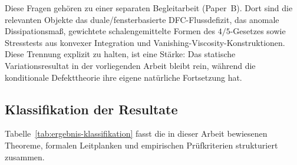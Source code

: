 \documentclass[12pt,a4paper]{article}
\theoremstyle{definition}
\theoremstyle{plain}
\theoremstyle{remark}
\begin{document}
Diese Fragen gehören zu einer separaten Begleitarbeit (Paper~B). Dort sind die relevanten Objekte
das duale/fensterbasierte DFC-Flussdefizit, das anomale Dissipationsmaß,
gewichtete schalengemittelte Formen des $4/5$-Gesetzes sowie Stresstests aus konvexer Integration und
Vanishing-Viscosity-Konstruktionen. Diese Trennung explizit zu halten, ist eine Stärke: Das statische Variationsresultat in der vorliegenden Arbeit bleibt rein,
während die konditionale Defekttheorie ihre eigene natürliche Fortsetzung hat.

\clearpage
\subsection*{Klassifikation der Resultate}

Tabelle~\ref{tab:ergebnis-klassifikation} fasst die in dieser Arbeit bewiesenen Theoreme, formalen Leitplanken und empirischen Prüfkriterien strukturiert zusammen.
\end{document}
